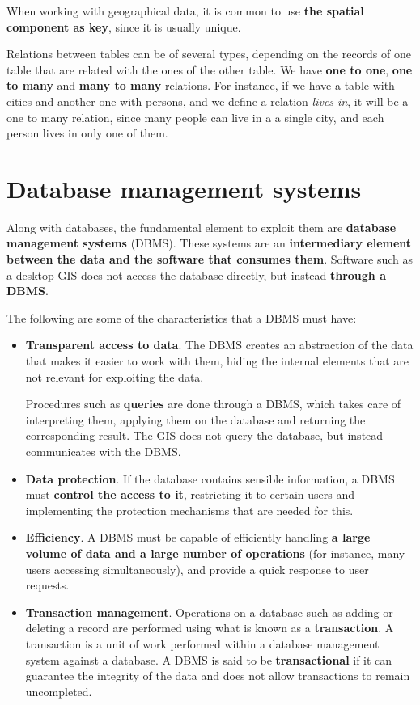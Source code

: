 When working with geographical data, it is common to use \textbf{the spatial component as key}, since it is usually unique.

Relations between tables can be of several types, depending on the records of one table that are related with the ones of the other table. We have \textbf{one to one}, \textbf{one to many} and \textbf{many to many} relations. For instance, if we have a table with cities and another one with persons, and we define a relation \emph{lives in}, it will be a one to many relation, since many people can live in a a single city, and each person lives in only one of them.


\section{Database management systems}

Along with databases, the fundamental element to exploit them are \textbf{database management systems} (DBMS). These systems are an \textbf{intermediary element between the data and the software that consumes them}. Software such as a desktop GIS does not access the database directly, but instead \textbf{through a DBMS}.

The following are some of the characteristics that a DBMS must have:

\begin{itemize}
	\item \textbf{Transparent access to data}. The DBMS creates an abstraction of the data that makes it easier to work with them, hiding the internal elements that are not relevant for exploiting the data.

	Procedures such as \textbf{queries} are done through a DBMS, which takes care of interpreting them, applying them on the database and returning the corresponding result. The GIS does not query the database, but instead communicates with the DBMS.
	\item \textbf{Data protection}. If the database contains sensible information, a DBMS must \textbf{control the access to it}, restricting it to certain users and implementing the protection mechanisms that are needed for this.
	\item \textbf{Efficiency}. A DBMS must be capable of efficiently handling \textbf{a large volume of data and a large number of operations} (for instance, many users accessing simultaneously), and provide a quick response to user requests.
	\item \textbf{Transaction management}. Operations on a database such as adding or deleting a record are performed using what is known as a \textbf{transaction}. A transaction is a unit of work performed within a database management system against a database. A DBMS is said to be \textbf{transactional} if it can guarantee the integrity of the data and does not allow transactions to remain uncompleted. 

\end{itemize}

